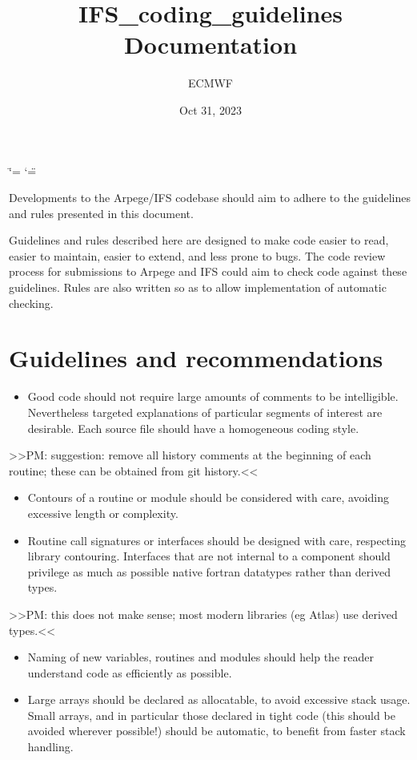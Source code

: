\documentclass[letterpaper,10pt,english]{sphinxmanual}
\title{IFS\_coding\_guidelines Documentation}
\date{Oct 31, 2023}
\author{ECMWF}
\begin{document}
\ifdefined\shorthandoff
  \ifnum\catcode`\=\string=\active\shorthandoff{=}\fi
  \ifnum\catcode`\"=\active{}\fi
\fi

\pagestyle{empty}
\sphinxmaketitle
\pagestyle{plain}
\sphinxtableofcontents
\pagestyle{normal}
\label{\detokenize{index::doc}}


Developments to the Arpege/IFS codebase should aim to adhere to the guidelines
and rules presented in this document.

Guidelines and rules described here are designed to make code easier to read,
easier to maintain, easier to extend, and less prone to bugs.
The code review process for submissions to Arpege and IFS could aim to check
code against these guidelines.
Rules are also written so as to allow implementation of automatic checking.


\chapter{Guidelines and recommendations}
\label{\detokenize{index:guidelines-and-recommendations}}\begin{itemize}
\item {} 
Good code should not require large amounts of comments to be intelligible.
Nevertheless targeted explanations of particular segments of interest are desirable.
Each source file should have a homogeneous coding style.

\end{itemize}

\textgreater{}\textgreater{}PM: suggestion: remove all history comments at the beginning of each routine; these can
be obtained from git history.\textless{}\textless{}
\begin{itemize}
\item {} 
Contours of a routine or module should be considered with care, avoiding excessive length
or complexity.

\item {} 
Routine call signatures or interfaces should be designed with care, respecting library
contouring. Interfaces that are not internal to a component should privilege as much as
possible native fortran datatypes rather than derived types.

\end{itemize}

\textgreater{}\textgreater{}PM: this does not make sense; most modern libraries (eg Atlas) use derived types.\textless{}\textless{}
\begin{itemize}
\item {} 
Naming of new variables, routines and modules should help the reader understand code as efficiently
as possible. 

\item {} 
Large arrays should be declared as allocatable, to avoid excessive stack usage.
Small arrays, and in particular those declared in tight code (this should be avoided wherever
possible!) should be automatic, to benefit from faster stack handling.

\end{itemize}
\end{document}
